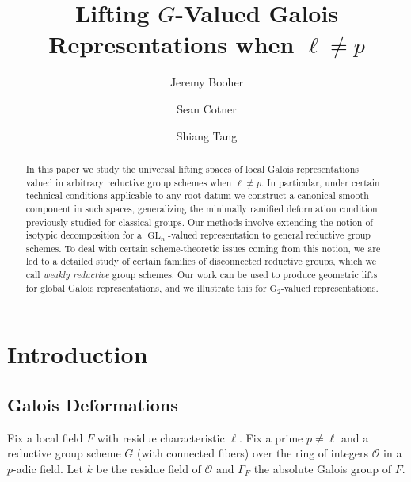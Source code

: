 \documentclass[11pt, letterpaper,english]{amsart}
\title{Lifting $G$-Valued Galois Representations when $\ell \neq p$}
\author{Jeremy Booher}
\author{Sean Cotner}
\author{Shiang Tang}
\theoremstyle{plain}
\theoremstyle{definition}
\numberwithin{equation}{section}
\numberwithin{lem}{section}
\newcommand{\cO}{\mathcal{O}}
\DeclareMathOperator{\GL}{GL}
\begin{document}
 

\begin{abstract}
In this paper we study the universal lifting spaces of local Galois representations valued in arbitrary reductive group schemes when $\ell \neq p$. In particular, under certain technical conditions applicable to any root datum we construct a canonical smooth component in such spaces, generalizing the minimally ramified deformation condition previously studied for classical groups. Our methods involve extending the notion of isotypic decomposition for a $\GL_n$-valued representation to general reductive group schemes. To deal with certain scheme-theoretic issues coming from this notion, we are led to a detailed study of certain families of disconnected reductive groups, which we call \textit{weakly reductive} group schemes. Our work can be used to produce geometric lifts for global Galois representations, and we illustrate this for $\mathrm{G}_2$-valued representations.

%
\end{abstract}

\maketitle

\section{Introduction}

\subsection{Galois Deformations}  \label{ss:galoisdef}

Fix a local field $F$ with residue characteristic $\ell$.  Fix a prime $p \neq \ell$ and a reductive group scheme $G$ (with connected fibers) over the ring of integers $\cO$ in a $p$-adic field.  Let $k$ be the residue field of $\cO$ and $\Gamma_F$ the absolute Galois group of $F$.
\end{document}
